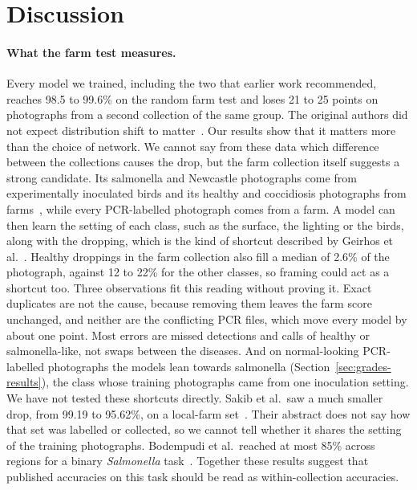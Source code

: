 \section{Discussion}
\label{sec:discussion}

\paragraph{What the farm test measures.} Every model we trained, including the two that earlier work recommended,
reaches 98.5 to 99.6\% on the random farm test and loses 21 to 25 points on photographs from a second collection of
the same group. The original authors did not expect distribution shift to matter~\cite{machuve2022}. Our results show
that it matters more than the choice of network. We cannot say from these data which difference between the
collections causes the drop, but the farm collection itself suggests a strong candidate. Its salmonella and
Newcastle photographs come from experimentally inoculated birds and its healthy and coccidiosis photographs from
farms~\cite{machuve2021farm}, while every PCR-labelled photograph comes from a farm. A model can then learn the
setting of each class, such as the surface, the lighting or the birds, along with the dropping, which is the kind of
shortcut described by Geirhos et al.~\cite{geirhos2020}. Healthy droppings in the farm collection also fill a median
of 2.6\% of the photograph, against 12 to 22\% for the other classes, so framing could act as a shortcut too. Three
observations fit this reading without proving it. Exact duplicates are not the cause, because removing them leaves
the farm score unchanged, and neither are the conflicting PCR files, which move every model by about one point. Most
errors are missed detections and calls of healthy or salmonella-like, not swaps between the diseases. And on
normal-looking PCR-labelled photographs the models lean towards salmonella (Section~\ref{sec:grades-results}), the class
whose training photographs came from one inoculation setting. We have not tested these shortcuts directly. Sakib et
al.\ saw a much smaller drop, from 99.19 to 95.62\%, on a local-farm set~\cite{sakib2026}. Their abstract does not say
how that set was labelled or collected, so we cannot tell whether it shares the setting of the training photographs.
Bodempudi et al.\ reached at most 85\% across regions for a binary \emph{Salmonella} task~\cite{bodempudi2026}.
Together these results suggest that published accuracies on this task should be read as within-collection
accuracies.

